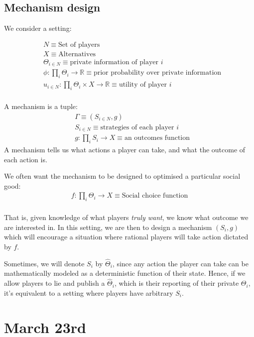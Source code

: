 \documentclass[11pt]{book}
\begin{document}
\section{Mechanism design}
We consider a setting:

\begin{align*}
    &N \equiv \text{Set of players} \\
    &X  \equiv \text{Alternatives} \\
    &\Theta_{i \in N} \equiv \text{private information of player $i$} \\
    &\phi: \prod_i \Theta_i \rightarrow \mathbb R \equiv \text{prior probability over private information} \\
    &u_{i \in N}: \prod_i \Theta_i \times X \rightarrow \mathbb R \equiv \text{utility of player $i$} \\
\end{align*}

A mechanism is a tuple:
\begin{align*}
    &\Gamma \equiv (S_{i \in N}, g) \\
    &S_{i \in N} \equiv \text{strategies of each player $i$} \\
    &g: \prod_i S_i \rightarrow X \equiv \text{an outcomes function}
\end{align*}
A mechanism tells us what actions a player can take, and what the outcome
of each action is.

We often want the mechanism to be designed to optimised a particular social good:
\begin{align*}
    f: \prod_i \Theta_i \rightarrow X \equiv \text{Social choice function} \\
\end{align*}

That is, given knowledge of what players \emph{truly want}, we know what
outcome we are interested in. In this setting, we are then to design 
a mechanism $(S_i, g)$ which will encourage a situation where rational players
will take action dictated by $f$.

Sometimes, we will denote $S_i$ by $\hat \Theta_i$, since any action the
player can take can be mathematically modeled as a deterministic function
of their state. Hence, if we allow players to lie and publish 
a $\hat \Theta_i$, which is their reporting of their private $\Theta_i$, it's
equivalent to a setting where players have arbitrary $S_i$.

\chapter{March 23rd}
\end{document}
